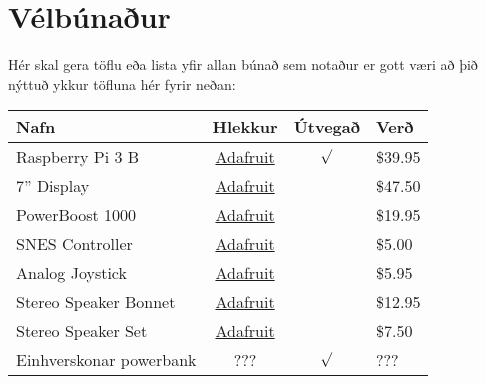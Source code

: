 \section{Vélbúnaður}
Hér skal gera töflu eða lista yfir allan búnað sem notaður er gott væri að þið nýttuð ykkur töfluna hér fyrir neðan:


\begin{tabular}{l c c l}
    \textbf{Nafn} & \textbf{Hlekkur} & \textbf{Útvegað} & \textbf{Verð} \\
    \hline
    Raspberry Pi 3 B & \href{https://www.adafruit.com/products/3055}{Adafruit} & $\surd $& \$39.95\\
    \hline
    7'' Display & \href{https://www.adafruit.com/products/2354}{Adafruit} & & \$47.50\\
    \hline
    PowerBoost 1000 & \href{https://www.adafruit.com/products/2465}{Adafruit} & & \$19.95 \\
    \hline
    SNES Controller & \href{https://www.adafruit.com/products/131}{Adafruit} & & \$5.00 \\
    \hline
    Analog Joystick & \href{https://www.adafruit.com/products/512}{Adafruit} & & \$5.95 \\
    \hline
    Stereo Speaker Bonnet & \href{https://www.adafruit.com/products/3346}{Adafruit} & & \$12.95 \\
    \hline
    Stereo Speaker Set & \href{https://www.adafruit.com/products/1669}{Adafruit} & & \$7.50\\
    \hline
    Einhverskonar powerbank & ??? & $\surd $ & ??? \\
\end{tabular}
